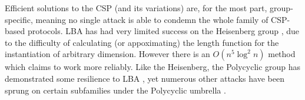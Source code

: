 Efficient solutions to the CSP (and its variations) are, for the most part, group-specific, meaning no single attack is able to condemn the whole family of CSP-based protocols. LBA has had very limited success on the Heisenberg group , due to the difficulty of calculating (or appoximating) the length function for the instantiation of arbitrary dimension. However there is an $O(n^5 \log^2 n)$ method \cite{heisenberg_ptime} which claims to work more reliably. Like the Heisenberg, the Polycyclic group has demonstrated some resilience to LBA \cite{polycyclic_lba}, yet numerous other attacks have been sprung on certain subfamilies under the Polycyclic umbrella \cite{polycyclic_survey}.

